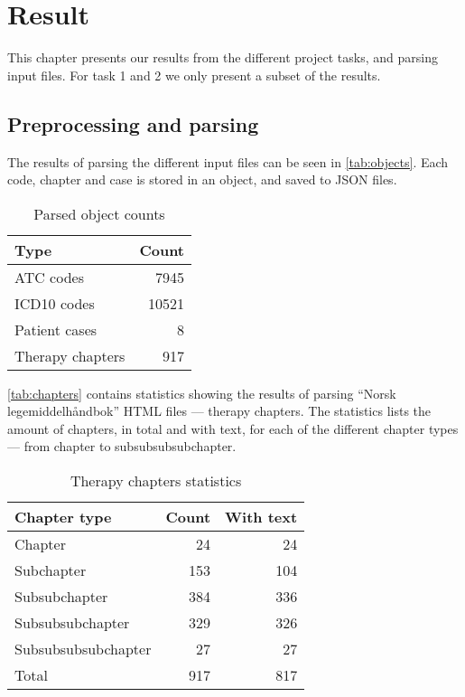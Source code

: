 \chapter{Result}
This chapter presents our results from the different project tasks, and
parsing input files. For task 1 and 2 we only present a subset of the results.


\section{Preprocessing and parsing}
The results of parsing the different input files can be seen in
\autoref{tab:objects}. Each code, chapter and case is stored in an object,
and saved to JSON files.
\begin{table}[htbp] \footnotesize \center
\caption{Parsed object counts\label{tab:objects}}
\begin{tabular}{l r}
    \toprule
    Type & Count \\
    \midrule
	ATC codes & 7945 \\
	ICD10 codes & 10521 \\
	Patient cases & 8 \\
	Therapy chapters & 917 \\
	\bottomrule
\end{tabular}
\end{table}

\autoref{tab:chapters} contains statistics showing the results of parsing
``Norsk legemiddelhåndbok'' HTML files --- therapy chapters. The statistics
lists the amount of chapters, in total and with text, for each of the
different chapter types --- from chapter to subsubsubsubchapter.
\begin{table}[htbp] \footnotesize \center
\caption{Therapy chapters statistics\label{tab:chapters}}
\begin{tabular}{l r r}
    \toprule
    Chapter type & Count & With text \\
    \midrule
	Chapter & 24 & 24 \\
	Subchapter & 153 & 104 \\
	Subsubchapter & 384 & 336 \\
	Subsubsubchapter & 329 & 326 \\
	Subsubsubsubchapter & 27 & 27 \\
    \midrule
	Total & 917 & 817 \\
	\bottomrule
\end{tabular}
\end{table}


